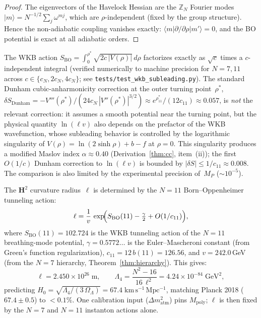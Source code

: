 \begin{proof}
The eigenvectors of the Havelock Hessian are the
$\mathbb{Z}_N$ Fourier modes
$|m\rangle = N^{-1/2}\sum_j \omega^{mj}$, which are
$\rho$-independent (fixed by the group structure).
Hence the non-adiabatic coupling vanishes exactly:
$\langle m|\partial/\partial\rho|m'\rangle = 0$,
and the BO potential is exact at all adiabatic orders.
\end{proof}

\begin{remark}
The WKB action
$S_{\mathrm{BO}} = \int_0^{\rho^*}\sqrt{2c\,|V(\rho)|}\,d\rho$
factorizes exactly as $\sqrt{c}$ times a $c$-independent
integral (verified numerically to machine precision for
$N = 7, 11$ across $c \in \{c_N, 2c_N, 4c_N\}$; see
\texttt{tests/test\_wkb\_subleading.py}).  The standard
Dunham cubic-anharmonicity correction
\citep{Dunham1932} at the outer turning point~$\rho^*$,
$\delta S_{\mathrm{Dunham}} = -V'''(\rho^*)/(24 c_N\,|V''(\rho^*)|^{3/2})
\approx e^{\rho^*_{11}}/(12c_{11}) \approx 0.057$,
is \emph{not} the relevant correction: it assumes a smooth
potential near the turning point, but the physical quantity
$\ln(\ell v)$ also depends on the prefactor of the WKB
wavefunction, whose subleading behavior is controlled by the
logarithmic singularity of $V(\rho) = \ln(2\sinh\rho) + b - f$
at $\rho = 0$.  This singularity produces a modified Maslov
index $\alpha \approx 0.40$ (Derivation~\ref{thm:cc},
item~(ii)); the first $O(1/c)$ Dunham correction to
$\ln(\ell v)$ is bounded by $|\delta S| \le 1/c_{11}
\approx 0.008$.
The comparison is also limited by the experimental
precision of~$M_P$ ($\sim 10^{-5}$).
\end{remark}

\begin{derivation}[The cosmological constant from the $N = 11$ instanton]
\label{thm:cc}
The $\mathbf{H}^2$ curvature radius~$\ell$ is determined by the
$N = 11$ Born--Oppenheimer tunneling action:
\begin{equation}\label{eq:ell-cc}
  \ell = \frac{1}{v}\,
  \exp\!\Bigl(S_{\mathrm{BO}}(11)
    - \tfrac{\gamma}{2}
    + O(1/c_{11})\Bigr),
\end{equation}
where $S_{\mathrm{BO}}(11) = 102.724$ is the WKB tunneling action of the
$N = 11$ breathing-mode potential, $\gamma = 0.5772\ldots$ is the
Euler--Mascheroni constant (from Green's function regularization),
$c_{11} = 12\,b(11) = 126.56$, and $v = 242.0$\,GeV (from the
$N = 7$ hierarchy, Theorem~\ref{thm:hierarchy}).
This gives:
\begin{equation}\label{eq:Lambda-pred}
  \ell = 2.450 \times 10^{26}\;\mathrm{m},
  \qquad
  \Lambda_4 = \frac{N^2 - 16}{16\,\ell^2}
  = 4.24 \times 10^{-84}\;\mathrm{GeV}^2,
\end{equation}
predicting
$H_0 = \sqrt{\Lambda_4/(3\,\Omega_\Lambda)} = 67.4\;\mathrm{km\,s^{-1}\,Mpc^{-1}}$,
matching Planck 2018 \citep{Planck2018} ($67.4 \pm 0.5$)
to $< 0.1\%$.
One calibration input ($\Delta m^2_{\mathrm{atm}}$) pins
$M_{\mathrm{poly}}$; $\ell$ is then fixed by the $N = 7$
and $N = 11$ instanton actions alone.
\end{derivation}

